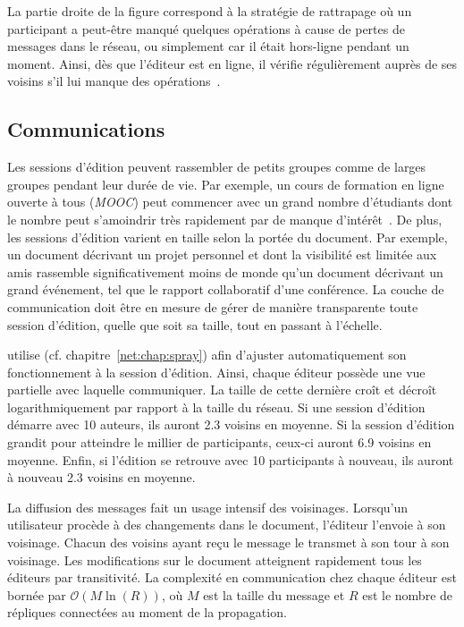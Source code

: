 \noindent La partie droite de la figure correspond à la stratégie de rattrapage
où un participant a peut-être manqué quelques opérations à cause de pertes de
messages dans le réseau, ou simplement car il était hors-ligne pendant un
moment. Ainsi, dès que l'éditeur est en ligne, il vérifie régulièrement auprès
de ses voisins s'il lui manque des opérations~\cite{demers1987epidemic,
  vanderlinde2016delta}.


\subsection{Communications}

Les sessions d'édition peuvent rassembler de petits groupes comme de larges
groupes pendant leur durée de vie. Par exemple, un cours de formation en ligne
ouverte à tous (\emph{MOOC}) peut commencer avec un grand nombre d'étudiants
dont le nombre peut s'amoindrir très rapidement par de manque
d'intérêt~\cite{breslow2013studying}. De plus, les sessions d'édition varient en
taille selon la portée du document. Par exemple, un document décrivant un projet
personnel et dont la visibilité est limitée aux amis rassemble significativement
moins de monde qu'un document décrivant un grand événement, tel que le rapport
collaboratif d'une conférence. La couche de communication doit être en mesure de
gérer de manière transparente toute session d'édition, quelle que soit sa
taille, tout en passant à l'échelle.

\CRATE utilise \SPRAY (cf. chapitre~\ref{net:chap:spray}) afin d'ajuster
automatiquement son fonctionnement à la session d'édition. Ainsi, chaque éditeur
possède une vue partielle avec laquelle communiquer. La taille de cette dernière
croît et décroît logarithmiquement par rapport à la taille du réseau. Si une
session d'édition démarre avec 10 auteurs, ils auront 2.3 voisins en moyenne. Si
la session d'édition grandit pour atteindre le millier de participants, ceux-ci
auront 6.9 voisins en moyenne. Enfin, si l'édition se retrouve avec 10
participants à nouveau, ils auront à nouveau 2.3 voisins en moyenne.

La diffusion des messages fait un usage intensif des voisinages. Lorsqu'un
utilisateur procède à des changements dans le document, l'éditeur l'envoie à son
voisinage. Chacun des voisins ayant reçu le message le transmet à son tour à son
voisinage. Les modifications sur le document atteignent rapidement tous les
éditeurs par transitivité. La complexité en communication chez chaque éditeur
est bornée par $\mathcal{O}(M\ln(R))$, où $M$ est la taille du message et $R$
est le nombre de répliques connectées au moment de la propagation.

